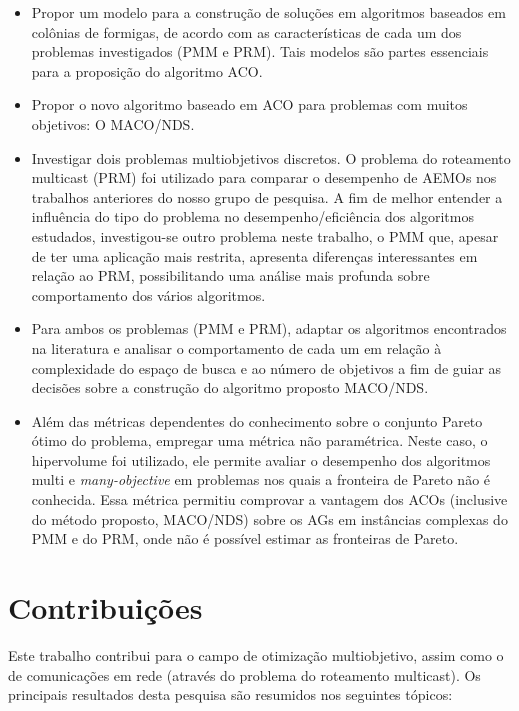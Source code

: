 \begin{itemize}
	\item Propor um modelo para a construção de soluções em algoritmos baseados em colônias de formigas, de acordo com as características de cada um dos problemas investigados (PMM e PRM). Tais modelos são partes essenciais para a proposição do algoritmo ACO.
	\item Propor o novo algoritmo baseado em \ac{ACO} para problemas com muitos objetivos: O \ac{MACO/NDS}. 
	\item Investigar dois problemas multiobjetivos discretos. O problema do roteamento multicast (PRM) foi utilizado para comparar o desempenho de AEMOs nos trabalhos anteriores do nosso grupo de pesquisa. A fim de melhor entender a influência do tipo do problema no desempenho/eficiência dos algoritmos estudados, investigou-se outro problema neste trabalho, o \ac{PMM} que, apesar de ter uma aplicação mais restrita, apresenta diferenças interessantes em relação ao \ac{PRM}, possibilitando uma análise mais profunda sobre comportamento dos vários algoritmos.
	\item Para ambos os problemas (\ac{PMM} e \ac{PRM}), adaptar os algoritmos encontrados na literatura e analisar o comportamento de cada um em relação à complexidade do espaço de busca e ao número de objetivos a fim de guiar as decisões sobre a construção do algoritmo proposto MACO/NDS.
	\item Além das métricas dependentes do conhecimento sobre o conjunto Pareto ótimo do problema, empregar uma métrica não paramétrica. Neste caso, o hipervolume foi utilizado, ele permite avaliar o desempenho dos algoritmos multi e \textit{many-objective} em problemas nos quais a fronteira de Pareto não é conhecida. Essa métrica permitiu comprovar a vantagem dos ACOs (inclusive do método proposto, MACO/NDS) sobre os AGs em instâncias complexas do PMM e do PRM, onde não é possível estimar as fronteiras de Pareto.
\end{itemize}


\section{Contribuições}
Este trabalho contribui para o campo de otimização multiobjetivo, assim como o de comunicações em rede (através do problema do roteamento multicast). Os principais resultados desta pesquisa são resumidos nos seguintes tópicos:

